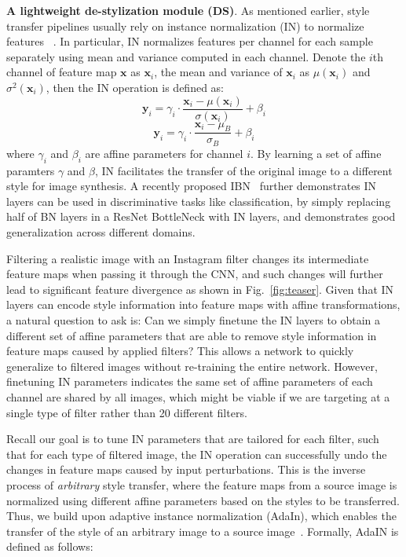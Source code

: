 \documentclass[letterpaper]{article} %
\newcommand{\xx}{{\bm x}}
\newcommand{\yy}{{\bm y}}
\begin{document}
\textbf{A lightweight de-stylization module (DS)}. As mentioned earlier, style transfer pipelines usually rely on instance normalization (IN) to normalize features ~\cite{ulyanov2016instance,huang2017adain}. In particular, IN normalizes features per channel for each sample separately using mean and variance computed in each channel. Denote the $i$th channel of feature map $\xx$ as $\xx_i$, the mean and variance of $\xx_i$ as $\mu(\xx_i)$ and $\sigma^2(\xx_i)$, then the {IN} operation is defined as: 
\begin{equation}
\yy_i = \gamma_i\cdot\frac{\xx_i-\mu(\xx_i)}{\sigma(\xx_i)}+\beta_i
\end{equation}
\begin{equation}
\yy_i = \gamma_i\cdot\frac{\xx_i-\mu_B}{\sigma_B}+\beta_i
\end{equation}
where $\gamma_i$ and $\beta_i$ are affine parameters for channel $i$. By learning a set of affine paramters $\gamma$ and $\beta$, IN facilitates the transfer of the original image to a different style for image synthesis. A recently proposed IBN~\cite{pan2018two} further demonstrates IN layers can be used in discriminative tasks like classification, by simply replacing half of BN layers in a ResNet BottleNeck with IN layers, and demonstrates good generalization across different domains.


Filtering a realistic image with an Instagram filter changes its intermediate feature maps when passing it through the CNN, and such changes will further lead to significant feature divergence as shown in Fig.~\ref{fig:teaser}. Given that IN layers can encode style information into feature maps with affine transformations, a natural question to ask is: Can we simply finetune the IN layers to obtain a different set of affine parameters that are able to remove style information in feature maps caused by applied filters? This allows a network to quickly generalize to filtered images without re-training the entire network. However, finetuning IN parameters indicates the same set of affine parameters of each channel are shared by all images, which might be viable if we are targeting at a single type of filter rather than 20 different filters.

Recall our goal is to tune IN parameters that are tailored for each filter, such that for each type of filtered image, the IN operation can successfully undo the changes in feature maps caused by input perturbations. This is the inverse process of \emph{arbitrary} style transfer, where the feature maps from a source image is normalized using different affine parameters based on the styles to be transferred. Thus, we build upon adaptive instance normalization (AdaIn), which enables the transfer of the style of an arbitrary image to a source image~\cite{huang2017adain}. Formally, \textrm{AdaIN} is defined as follows:
\end{document}
